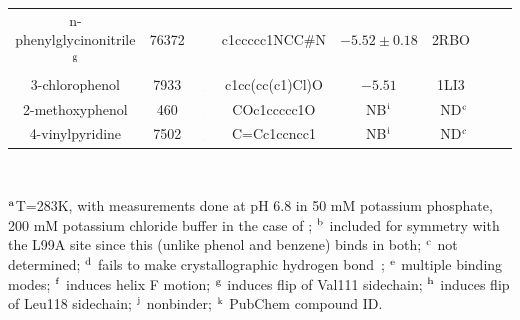 \documentclass[aps,pre,twocolumn,nofootinbib,superscriptaddress,10pt, final,tightenlines]{revtex4-1}
\begin{document}
\begin{table}
\begin{center}
\begin{tabular}{@{}| c | c | c | c | c | c | c | c@{}}
n-phenylglycinonitrile$^{\rm g}$ & 76372 & \includegraphics[width=0.04\textwidth]{figures/76372.pdf} & c1ccccc1NCC\#N & $-5.52\pm0.18$ & 2RBO~\cite{boyce_predicting_2009} &  \cite{boyce_predicting_2009} \\ 
3-chlorophenol & 7933 & \includegraphics[width=0.04\textwidth]{figures/7933.pdf} & c1cc(cc(c1)Cl)O & $-5.51$ & 1LI3~\cite{wei_model_2002} & \cite{wei_model_2002} \\ 
2-methoxyphenol & 460 & \includegraphics[width=0.04\textwidth]{figures/460.pdf} & COc1ccccc1O & NB$^{\rm i}$ & ND$^{\rm c}$ & \cite{boyce_predicting_2009} \\ %
4-vinylpyridine & 7502 & \includegraphics[width=0.025\textwidth]{figures/7502.pdf} & C=Cc1ccncc1 & NB$^{\rm i}$ & ND$^{\rm c}$ & \cite{wei_model_2002} \\ 
\hline
\end{tabular}\\
\end{center}
$^{\rm a}$T=283K, with measurements done at pH 6.8 in 50 mM potassium phosphate, 200 mM potassium chloride buffer in the case of \cite{boyce_predicting_2009}; $^{\rm b}$ included for symmetry with the L99A site since this (unlike phenol and benzene) binds in both; $^{\rm c}$ not determined; $^{\rm d}$ fails to make crystallographic hydrogen bond~\cite{boyce_predicting_2009}; $^{\rm e}$ multiple binding modes; $^{\rm f}$ induces helix F motion; $^{\rm g}$ induces flip of Val111 sidechain; $^{\rm h}$ induces flip of Leu118 sidechain; $^{\rm j}$ nonbinder; $^{\rm k}$ PubChem compound ID.
\end{table}
\endgroup
\end{document}

